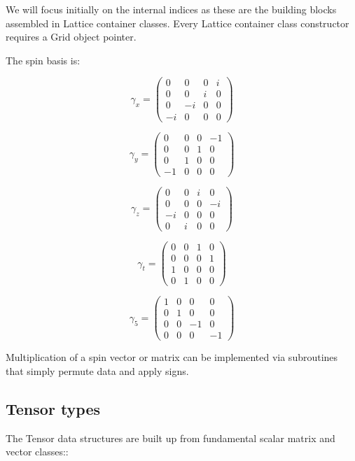 \documentclass[letter,10pt]{report}
\begin{document}
We will focus initially on the internal indices as these are the building blocks assembled
in Lattice container classes. Every Lattice container class constructor requires a Grid object 
pointer. 

The spin basis is:

$$ \gamma_x= \left(\begin{array}{cccc}    0& 0& 0& i\\  0& 0& i& 0\\  0&-i& 0& 0\\ -i& 0& 0& 0 \end{array}\right)$$

$$ \gamma_y= \left(\begin{array}{cccc}    0& 0& 0&-1\\  0& 0& 1& 0\\  0& 1& 0& 0\\ -1& 0& 0& 0 \end{array}\right)$$

$$ \gamma_z= \left(\begin{array}{cccc}    0& 0& i& 0\\  0& 0& 0&-i\\ -i& 0& 0& 0\\  0& i& 0& 0 \end{array}\right)$$

$$ \gamma_t= \left(\begin{array}{cccc}    0& 0& 1& 0\\  0& 0& 0& 1\\  1& 0& 0& 0\\  0& 1& 0& 0 \end{array}\right)$$

$$ \gamma_5= \left(\begin{array}{cccc}    1& 0& 0& 0\\  0& 1& 0& 0\\  0& 0&-1 &0\\  0& 0& 0&-1 \end{array}\right)$$

Multiplication of a spin vector or matrix can be implemented via subroutines that simply permute data and apply signs.

\subsection{Tensor types}

The Tensor data structures are built up from fundamental 
scalar matrix and vector classes::
\end{document}
